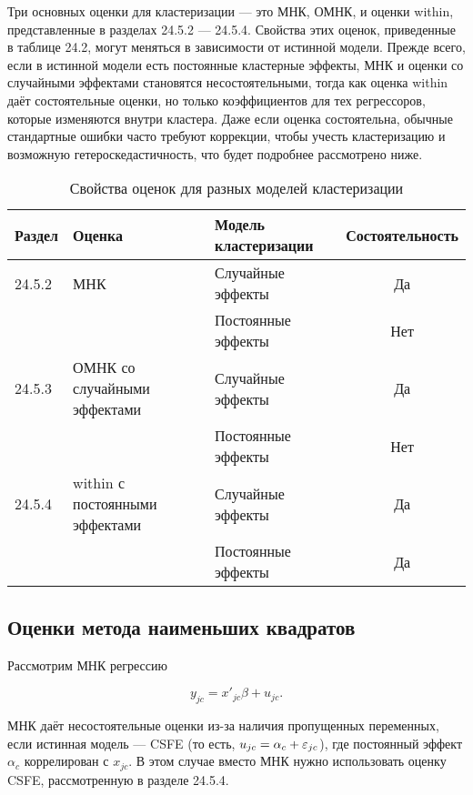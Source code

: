 Три основных оценки для кластеризации --- это МНК, ОМНК, и оценки within, представленные в разделах 24.5.2 --- 24.5.4. Свойства этих оценок, приведенные в таблице 24.2, могут меняться в зависимости от истинной модели. Прежде всего, если в истинной модели есть постоянные кластерные эффекты, МНК и оценки со случайными эффектами становятся несостоятельными, тогда как оценка within даёт состоятельные оценки, но только коэффициентов для тех регрессоров, которые изменяются внутри кластера. Даже если оценка состоятельна, обычные стандартные ошибки часто требуют коррекции, чтобы учесть кластеризацию и возможную гетероскедастичность, что будет подробнее рассмотрено ниже. 

\begin{table}[h]
\caption{\label{tab:clastpropert} Свойства оценок для разных моделей кластеризации}
\begin{center}
\begin{tabular}{lllc}
\hline
\hline
Раздел & Оценка & Модель кластеризации &  Состоятельность \\
\hline
24.5.2 & МНК & Случайные эффекты & Да \\
  &   & Постоянные эффекты & Нет \\
24.5.3 & ОМНК со случайными эффектами & Случайные эффекты & Да \\
  &   & Постоянные эффекты & Нет \\
24.5.4 & within с постоянными эффектами & Случайные эффекты & Да \\
  &   & Постоянные эффекты & Да \\
\hline
\hline
\end{tabular}
\end{center}
\end{table}

\subsection{Оценки метода наименьших квадратов}

Рассмотрим МНК регрессию

\begin{equation}
\label{eq24.28}
y_{jc} = x'_{jc} \beta + u_{jc}.
\end{equation}

МНК даёт несостоятельные оценки из-за наличия пропущенных переменных, если истинная модель --- CSFE (то есть, $u_{jc} = \alpha_c + \varepsilon_{jc}$), где постоянный эффект $\alpha_c$ коррелирован с $x_{jc}$. В этом случае вместо МНК нужно использовать оценку CSFE, рассмотренную в разделе 24.5.4. 

